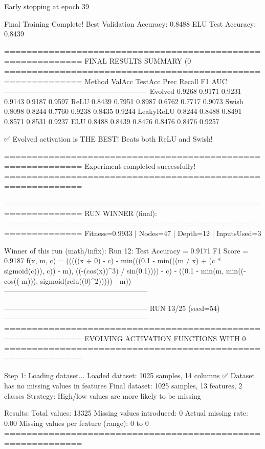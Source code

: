Early stopping at epoch 39

Final Training Complete!
Best Validation Accuracy: 0.8488
ELU Test Accuracy: 0.8439

============================================================
FINAL RESULTS SUMMARY (0%
============================================================
Method             ValAcc     TestAcc    Prec       Recall     F1         AUC
------------------------------------------------------------
Evolved            0.9268     0.9171     0.9231     0.9143     0.9187     0.9597
ReLU               0.8439     0.7951     0.8987     0.6762     0.7717     0.9073
Swish              0.8098     0.8244     0.7760     0.9238     0.8435     0.9244
LeakyReLU          0.8244     0.8488     0.8491     0.8571     0.8531     0.9237
ELU                0.8488     0.8439     0.8476     0.8476     0.8476     0.9257

✅ Evolved activation is THE BEST! Beats both ReLU and Swish!

============================================================
Experiment completed successfully!
============================================================

============================================================
RUN WINNER (final):
============================================================
Fitness=0.9933 | Nodes=47 | Depth=12 | InputsUsed=3

Winner of this run (math/infix):
  Run 12:
     Test Accuracy = 0.9171
     F1 Score      = 0.9187
     f(x, m, c)    = (((((x + 0) - c) - min(((0.1 - min(((m / x) + (c * sigmoid(c))), c)) - m), ((-(cos(x))^3) / sin(0.1)))) - c) - ((0.1 - min(m, min((-cos((-m))), sigmoid(relu((0)^2))))) - m))
------------------------------------------------------------

------------------------------------------------------------
RUN 13/25 (seed=54)
------------------------------------------------------------
============================================================
EVOLVING ACTIVATION FUNCTIONS
WITH 0%
============================================================

Step 1: Loading dataset...
Loaded dataset: 1025 samples, 14 columns
✅ Dataset has no missing values in features
Final dataset: 1025 samples, 13 features, 2 classes
Strategy: High/low values are more likely to be missing

Results:
  Total values: 13325
  Missing values introduced: 0
  Actual missing rate: 0.00%
  Missing values per feature (range): 0 to 0
============================================================


